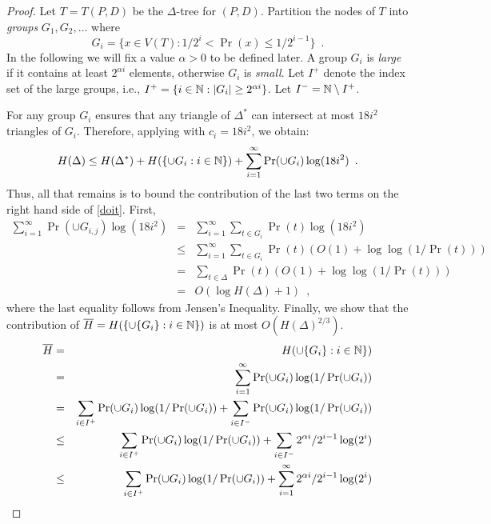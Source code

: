 \documentclass[lotsofwhite]{patmorin}
\begin{document}
\begin{proof}
Let $T=T(P,D)$ be the $\Delta$-tree for $(P,D)$.
Partition the nodes of $T$ into
\emph{groups} $G_1,G_2,\ldots$ where
\[
	G_i = \{x\in V(T) : 1/2^{i} < \Pr(x) \le 1/2^{i-1} \} \enspace .
\]
In the following we will fix a value $\alpha > 0$ to be defined later.
A group $G_i$ is
\emph{large} if it contains at least $2^{\alpha i}$ elements,
otherwise $G_i$ is \emph{small}.  Let $I^+$ denote the index set of
the large groups, i.e., $I^{+}=\{i\in\mathbb{N} : |G_i| \ge 2^{\alpha i}\}$.
Let $I^{-}= \mathbb{N}\setminus I^+$.

For any group $G_{i}$ 
 ensures that any triangle of
$\Delta^*$ can intersect at most $18i^2$ triangles of $G_{i}$.  Therefore,
applying  with $c_{i}=18i^2$, we obtain:
\begin{equation} 
 H(\Delta) \le 
   H(\Delta^*) + H(\{{\cup G_{i}} : i\in\N\}) 
   + \sum_{i=1}^{\infty}\Pr(\cup G_{i})\log(18i^2)  \enspace .
   \eqlabel{doit}
\end{equation}
Thus, all that remains is to bound the contribution of the last two
terms on the right hand side of \eqref{doit}.  First,
\begin{eqnarray*}
   \sum_{i=1}^{\infty}\Pr(\cup G_{i,j})\log(18i^2)
   &   =  & \sum_{i=1}^\infty\sum_{t\in G_i}\Pr(t)\log(18i^2) \\
   &  \le  & \sum_{i=1}^\infty\sum_{t\in G_i}\Pr(t)(O(1)+\log\log(1/\Pr(t))) \\
    &  =  & \sum_{t\in\Delta} \Pr(t) (O(1)+\log\log(1/\Pr(t))) \\
    &  =  & O(\log H(\Delta)+1) \enspace ,
\end{eqnarray*}
where the last equality follows from Jensen's Inequality.
Finally, we show that the contribution of $\overline
H=H(\{\cup\{G_{i}\} : i\in\mathbb{N}\})$ is at most
$O(H(\Delta)^{2/3})$. 
\begin{eqnarray*}
\overline H 
 &  =  & H(\cup\{G_{i}\} : i\in\N\}) \\
 &  =  & \sum_{i=1}^\infty\Pr(\cup G_{i})\log(1/\Pr(\cup G_{i})) \\
 &  =  & \sum_{i\in I^+}\Pr(\cup G_{i})\log(1/\Pr(\cup G_{i})) 
         + \sum_{i\in I^-}\Pr(\cup G_{i})\log(1/\Pr(\cup G_{i})) \\
 & \le & \sum_{i\in I^+}\Pr(\cup G_{i})\log(1/\Pr(\cup G_{i})) 
         + \sum_{i\in I^-}2^{\alpha i}/2^{i-1}\log(2^{i}) \\
 & \le & \sum_{i\in I^+}\Pr(\cup G_{i})\log(1/\Pr(\cup G_{i})) 
         + \sum_{i=1}^\infty 2^{\alpha i}/2^{i-1}\log(2^{i}) \\

\end{eqnarray*}
\end{proof}
\end{document}

